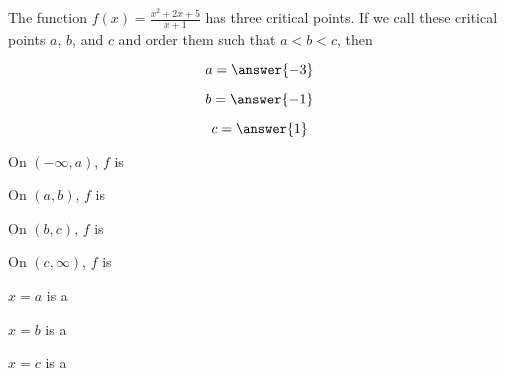 \documentclass{ximera}
\author{Steven Gubkin}
\begin{document}
\begin{exercise}

The function $f(x) =\frac{x^2+2x+5}{x+1}$ has three critical points.
If we call these critical points $a$, $b$, and $c$ and order them such
that $a < b < c$, then

$$
a = \answer{-3}
$$

$$
b=\answer{-1}
$$

$$
c=\answer{1}
$$



On $(-\infty,a)$, $f$ is 

On $(a,b)$, $f$ is 

On $(b,c)$, $f$ is 

On $(c,\infty)$, $f$ is 


$x=a$ is a 

$x=b$ is a 

$x=c$ is a 

\end{exercise}
\end{document}
